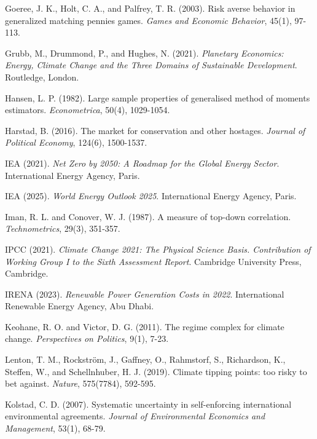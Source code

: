 \documentclass[10pt,a4paper]{article}
\begin{document}
\begin{list}{}{\setlength\leftmargin{1.5em}\setlength\itemindent{-1.5em}\setlength\itemsep{0.4em}}
\item Goeree, J. K., Holt, C. A., and Palfrey, T. R. (2003). Risk averse behavior in generalized matching
pennies games. \textit{Games and Economic Behavior}, 45(1), 97-113.

\item Grubb, M., Drummond, P., and Hughes, N. (2021). \textit{Planetary Economics: Energy, Climate
Change and the Three Domains of Sustainable Development}. Routledge, London.

\item Hansen, L. P. (1982). Large sample properties of generalised method of moments estimators.
\textit{Econometrica}, 50(4), 1029-1054.

\item Harstad, B. (2016). The market for conservation and other hostages. \textit{Journal of Political
Economy}, 124(6), 1500-1537.

\item IEA (2021). \textit{Net Zero by 2050: A Roadmap for the Global Energy Sector}. International Energy
Agency, Paris.

\item IEA (2025). \textit{World Energy Outlook 2025}. International Energy Agency, Paris.

\item Iman, R. L. and Conover, W. J. (1987). A measure of top-down correlation. \textit{Technometrics},
29(3), 351-357.

\item IPCC (2021). \textit{Climate Change 2021: The Physical Science Basis. Contribution of Working Group
I to the Sixth Assessment Report}. Cambridge University Press, Cambridge.

\item IRENA (2023). \textit{Renewable Power Generation Costs in 2022}. International Renewable Energy
Agency, Abu Dhabi.

\item Keohane, R. O. and Victor, D. G. (2011). The regime complex for climate change.
\textit{Perspectives on Politics}, 9(1), 7-23.

\item Lenton, T. M., Rockstr\"{o}m, J., Gaffney, O., Rahmstorf, S., Richardson, K., Steffen, W.,
and Schellnhuber, H. J. (2019). Climate tipping points: too risky to bet against.
\textit{Nature}, 575(7784), 592-595.

\item Kolstad, C. D. (2007). Systematic uncertainty in self-enforcing international environmental
agreements. \textit{Journal of Environmental Economics and Management}, 53(1), 68-79.


\end{list}
\end{document}
